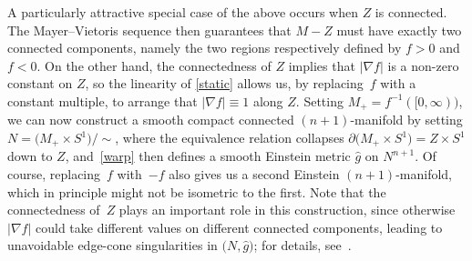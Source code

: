 \documentclass[10pt,a4paper]{amsart}
\numberwithin{equation}{section}
\begin{document}
A particularly attractive special case of the above occurs when $Z$ is connected.
The Mayer--Vietoris sequence then guarantees that $M-Z$ must have exactly two connected components, namely the two
 regions respectively defined by $f>0$ and $f< 0$. On the other hand, the connectedness of $Z$ implies that $|\nabla f|$ is a non-zero constant on $Z$,
so the linearity of \eqref{static} allows us, by replacing~$f$ with a constant multiple, to arrange that
$|\nabla f|\equiv 1$ along $Z$. Setting $M_+ = f^{-1} ([0,\infty))$, we can now construct a smooth compact connected $(n+1)$-manifold
by setting $N= \big( M_+\times S^1\big)/{\sim}$,
where the equivalence relation
collapses $\partial \big( M_+\times S^1\big)= Z\times S^1$ down to $Z$, and~\eqref{warp} then defines a smooth Einstein metric $\widehat{g}$ on $N^{n+1}$. Of course,
replacing~$f$ with~$-f$ also gives us a second Einstein $(n+1)$-manifold, which in principle might not be isometric to the first. Note that the connectedness of~$Z$ plays an important role in this construction, since otherwise $|\nabla f|$ could take different values on different connected components, leading to unavoidable
edge-cone singularities in $\big(N,\widehat{g}\big)$; for details, see~\cite{ambrozio}.
\end{document}

